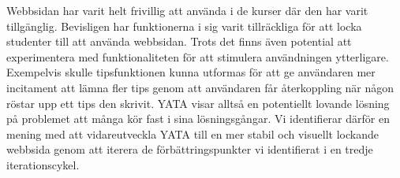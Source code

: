 Webbsidan har varit helt frivillig att använda i de kurser där den har varit tillgänglig. Bevisligen har funktionerna i sig varit tillräckliga för att locka studenter till att använda webbsidan. Trots det finns även potential att experimentera med funktionaliteten för att stimulera användningen ytterligare. Exempelvis skulle tipsfunktionen kunna utformas för att ge användaren mer incitament att lämna fler tips genom att användaren får återkoppling när någon röstar upp ett tips den skrivit. YATA visar alltså en potentiellt lovande lösning på problemet att många kör fast i sina lösningsgångar. Vi identifierar därför en mening med att vidareutveckla YATA till en mer stabil och visuellt lockande webbsida genom att iterera de förbättringspunkter vi identifierat i en tredje iterationscykel. 







